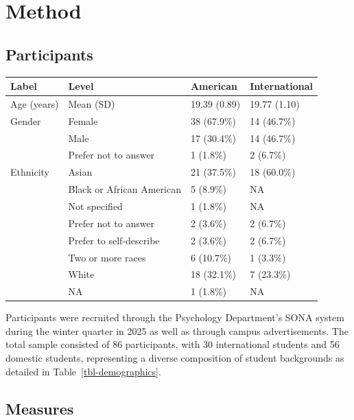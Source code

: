 \documentclass[
  man,
  floatsintext,
  longtable,
  nolmodern,
  notxfonts,
  notimes,
  colorlinks=true,linkcolor=blue,citecolor=blue,urlcolor=blue]{apa7}
\begin{document}
\section{Method}\label{method}

\subsection{Participants}\label{participants}

\begin{table}

{\caption{{Demographic Characteristics of
Participants}{\label{tbl-demographics}}}
\vspace{-20pt}}

\begin{longtable*}[t]{llll}
\toprule
Label & Level & American & International\\
\midrule
Age (years) & Mean (SD) & 19.39 (0.89) & 19.77 (1.10)\\
Gender & Female & 38 (67.9\%) & 14 (46.7\%)\\
 & Male & 17 (30.4\%) & 14 (46.7\%)\\
 & Prefer not to answer & 1 (1.8\%) & 2 (6.7\%)\\
Ethnicity & Asian & 21 (37.5\%) & 18 (60.0\%)\\
\addlinespace
 & Black or African American & 5 (8.9\%) & NA\\
 & Not specified & 1 (1.8\%) & NA\\
 & Prefer not to answer & 2 (3.6\%) & 2 (6.7\%)\\
 & Prefer to self-describe & 2 (3.6\%) & 2 (6.7\%)\\
 & Two or more races & 6 (10.7\%) & 1 (3.3\%)\\
\addlinespace
 & White & 18 (32.1\%) & 7 (23.3\%)\\
 & NA & 1 (1.8\%) & NA\\
\bottomrule
\end{longtable*}

\end{table}

Participants were recruited through the Psychology Department's SONA
system during the winter quarter in 2025 as well as through campus
advertisements. The total sample consisted of 86 participants, with 30
international students and 56 domestic students, representing a diverse
composition of student backgrounds as detailed in
Table~\ref{tbl-demographics}.

\subsection{Measures}\label{measures}
\end{document}
